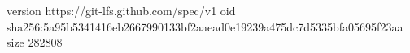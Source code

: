 version https://git-lfs.github.com/spec/v1
oid sha256:5a95b5341416eb2667990133bf2aaead0e19239a475dc7d5335bfa05695f23aa
size 282808
